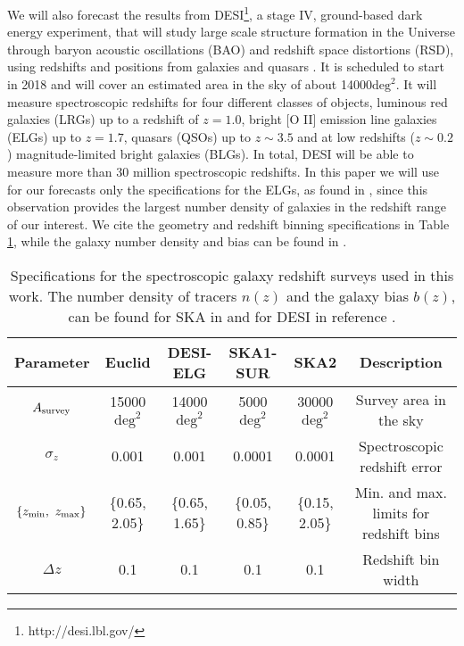 We will also forecast the results from DESI\footnote{http://desi.lbl.gov/}, a stage IV, ground-based dark energy experiment, that will study large scale structure formation in the Universe through baryon acoustic oscillations (BAO) and redshift space distortions (RSD), using redshifts and positions from galaxies and quasars \cite{desi_collaboration_desi_2016-1,desi_collaboration_desi_2016,levi_desi_2013}.
It is scheduled to start in 2018 
and will cover an estimated area in the sky of about 
14000$\text{deg}^2$. It will measure spectroscopic redshifts for four different classes of objects, luminous red galaxies (LRGs) up to a redshift of $z=1.0$, bright [O II] emission line galaxies (ELGs) up to $z=1.7$, quasars (QSOs) up to $z\sim3.5$ and at low redshifts ($z\sim0.2$) magnitude-limited bright galaxies (BLGs). In total, 
DESI will be able to measure more than 30 million spectroscopic redshifts.
In this paper we will use for our forecasts only the specifications for the ELGs, as found in \cite{desi_collaboration_desi_2016-1}, since this observation provides the largest number density of galaxies in the redshift range of our interest. We cite the geometry and redshift binning specifications in Table \ref{tab:GC-specifications}, while the galaxy number density and bias can be found in \cite{desi_collaboration_desi_2016-1}.




\begin{table}[h]
	\centering{}
	\begin{tabular}{|c|cccc|c|}
		\hline 
		\Tstrut \textbf{Parameter}  & \textbf{Euclid}  & \textbf{DESI-ELG}  & \textbf{SKA1-SUR}
		& \textbf{SKA2}  & \textbf{Description}\tabularnewline
		\hline 
		\Tstrut $A_{\rm survey}$  & 15000 $\mbox{deg}^{2}$  & 14000 $\mbox{deg}^{2}$  & 5000
		$\mbox{deg}^{2}$  & 30000 $\mbox{deg}^{2}$  & Survey area in the
		sky\tabularnewline
		$\sigma_{z}$  & 0.001  & 0.001  & 0.0001  & 0.0001  & Spectroscopic redshift
		error\tabularnewline
		$\{z_{\rm min},\ z_{\rm max}\}$  & \{0.65, 2.05\}  & \{0.65, 1.65\}  & \{0.05, 0.85\}
		& \{0.15, 2.05\}  & Min. and max. limits for redshift bins \tabularnewline
		$\Delta z$  & 0.1  & 0.1  & 0.1  & 0.1  & Redshift bin width\tabularnewline
		\hline 
	\end{tabular}\caption[Specifications for future GC surveys.]{\label{tab:GC-specifications} Specifications for
		the spectroscopic
		galaxy redshift surveys used in this work. The number density of tracers $n(z)$ and the galaxy bias $b(z)$, can be found for SKA in \cite{santos_hi_2015} and for DESI in reference \cite{desi_collaboration_desi_2016-1}.}
\end{table}



